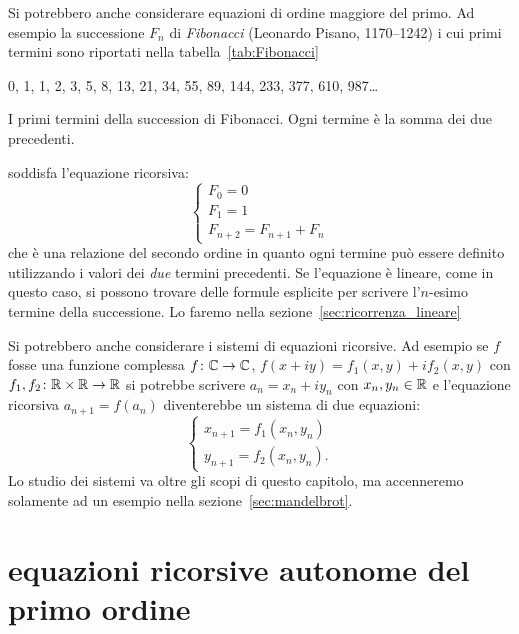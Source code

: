 Si potrebbero anche considerare equazioni di ordine maggiore del
primo. Ad esempio la successione $F_n$ di \emph{Fibonacci}
(Leonardo Pisano, 1170--1242)
i cui primi termini sono riportati nella tabella~\ref{tab:Fibonacci}
\begin{table}
  \begin{center}
  0, 1, 1, 2, 3, 5, 8, 13, 21, 34, 55, 89, 144,
  233, 377, 610, 987\dots
\end{center}
\caption{I primi termini della succession di Fibonacci.
Ogni termine è la somma dei due precedenti.}
\label{tab:Fibonacci}
\end{table}
%
%
%
%
soddisfa l'equazione ricorsiva:
\begin{equation}\label{eq:Fibonacci}
\begin{cases}
  F_0 = 0 \\
  F_1 = 1 \\
  F_{n+2} = F_{n+1} + F_n
\end{cases}
\end{equation}
che è una relazione del secondo ordine in quanto ogni termine può
essere definito utilizzando i valori dei \emph{due} termini precedenti.
Se l'equazione è lineare, come in questo caso, si possono trovare delle
formule esplicite per scrivere l'$n$-esimo termine della successione.
Lo faremo nella sezione~\ref{sec:ricorrenza_lineare}

Si potrebbero anche considerare i sistemi di equazioni ricorsive.
Ad esempio se $f$ fosse una funzione complessa $f\colon {\mathbb C} \to {\mathbb C}$,
$f(x+iy) = f_1(x,y) + i f_2(x,y)$ con $f_1,f_2 \colon {\mathbb R}\times{\mathbb R}\to{\mathbb R}$
si potrebbe scrivere $a_n = x_n + i y_n$ con $x_n, y_n \in {\mathbb R}$
e l'equazione ricorsiva $a_{n+1} = f(a_n)$
diventerebbe un sistema di due equazioni:
\[
  \begin{cases}
    x_{n+1} = f_1(x_n, y_n)\\
    y_{n+1} = f_2(x_n, y_n).
  \end{cases}
\]
Lo studio dei sistemi va oltre gli scopi di questo capitolo,
ma accenneremo solamente ad un esempio nella sezione~\ref{sec:mandelbrot}.

\section{equazioni ricorsive autonome del primo ordine}

